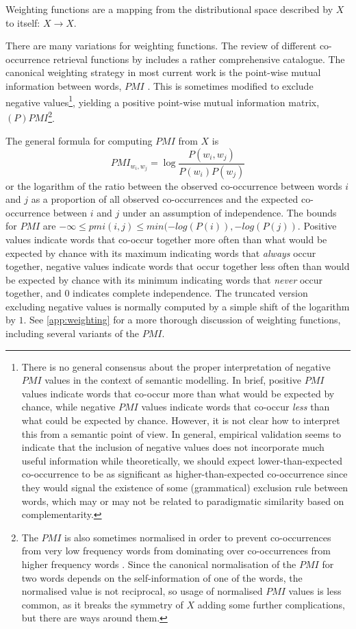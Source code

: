 Weighting functions are a mapping from the distributional space described by $X$ to itself: $X \rightarrow X$.

There are many variations for weighting functions.
The review of different co-occurrence retrieval functions by \citet{weeds2005} includes a rather comprehensive catalogue.
The canonical weighting strategy in most current work is the point-wise mutual information between words, $PMI$ \citep{church1990}.
This is sometimes modified to exclude negative values\footnote{
    There is no general consensus about the proper interpretation of negative $PMI$ values in the context of semantic modelling.
    In brief, positive $PMI$ values indicate words that co-occur more than what would be expected by chance, while negative $PMI$ values indicate words that co-occur \emph{less} than what could be expected by chance.
    However, it is not clear how to interpret this from a semantic point of view.
    In general, empirical validation seems to indicate that the inclusion of negative values does not incorporate much useful information while theoretically, we should expect lower-than-expected co-occurrence to be as significant as higher-than-expected co-occurrence since they would signal the existence of some (grammatical) exclusion rule between words, which may or may not be related to paradigmatic similarity based on complementarity.
}, yielding a positive point-wise mutual information matrix, $(P)PMI$\footnote{
    The $PMI$ is also sometimes normalised in order to prevent co-occurrences from very low frequency words from dominating over co-occurrences from higher frequency words \citep{bouma2009}.
    Since the canonical normalisation of the $PMI$ for two words depends on the self-information of one of the words, the normalised value is not reciprocal, so usage of normalised $PMI$ values is less common, as it breaks the symmetry of $X$ adding some further complications, but there are ways around them.
}.

The general formula for computing $PMI$ from $X$ is
\[
    PMI_{w_i,w_j} = \log{\frac{P(w_i,w_j)}{P(w_i)P(w_j)}}
\]
or the logarithm of the ratio between the observed co-occurrence between words $i$ and $j$ as a proportion of all observed co-occurrences and the expected co-occurrence between $i$ and $j$ under an assumption of independence.
The bounds for $PMI$ are $-\infty \leq pmi(i,j) \leq min( -log(P(i)), -log(P(j) )$.
Positive values indicate words that co-occur together more often than what would be expected by chance with its maximum indicating words that \emph{always} occur together, negative values indicate words that occur together less often than would be expected by chance with its minimum indicating words that \emph{never} occur together, and $0$ indicates complete independence.
The truncated version excluding negative values is normally computed by a simple shift of the logarithm by $1$.
See \autoref{app:weighting} for a more thorough discussion of weighting functions, including several variants of the $PMI$.

